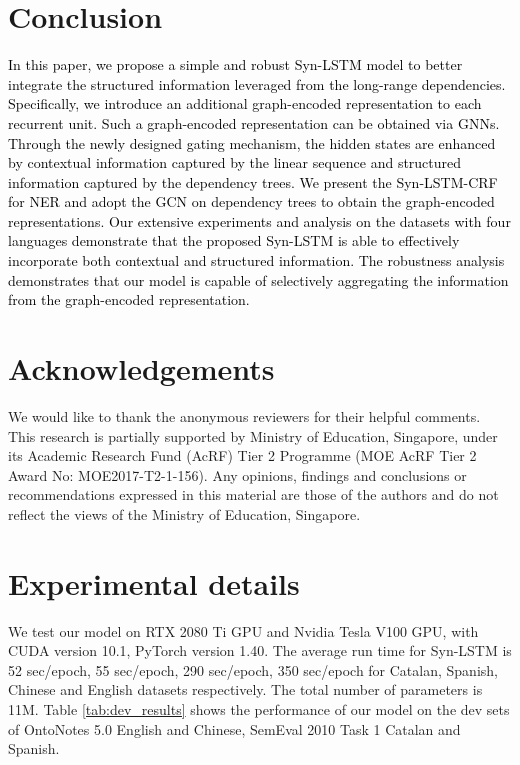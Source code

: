 \documentclass[11pt]{article}
\begin{document}
\section{Conclusion}
\textcolor{black}{
In this paper, we propose a simple and robust Syn-LSTM model to better integrate the structured information leveraged from the long-range dependencies.
Specifically, we introduce an additional graph-encoded representation to each recurrent unit. 
Such a graph-encoded representation can be obtained via GNNs. 
Through the newly designed gating mechanism, the hidden states are enhanced by contextual information captured by the linear sequence and structured information captured by the dependency trees. 
We present the Syn-LSTM-CRF for NER and adopt the GCN on dependency trees to obtain the graph-encoded representations.
Our extensive experiments and analysis on the datasets with four languages demonstrate that the proposed Syn-LSTM is able to effectively incorporate both contextual and structured information. The robustness analysis demonstrates that our model is capable of selectively aggregating the information from the graph-encoded representation.
}



\section*{Acknowledgements}

We would like to thank the anonymous reviewers for their helpful comments.
This research is partially supported by Ministry of Education, Singapore, under its Academic Research Fund (AcRF) Tier 2 Programme (MOE AcRF Tier 2 Award No: MOE2017-T2-1-156). 
Any opinions, findings and conclusions or recommendations expressed in this material are those of the authors and do not reflect the views of the Ministry of Education, Singapore.












\appendix

\section{Experimental details}
We test our model on RTX 2080 Ti GPU and Nvidia Tesla V100 GPU, with CUDA version 10.1, PyTorch version 1.40. 
The average run time for Syn-LSTM is 52 sec/epoch,  55 sec/epoch,  290 sec/epoch,  350 sec/epoch for Catalan, Spanish, Chinese and English datasets respectively.
The total number of parameters is 11M.
Table \ref{tab:dev_results} shows the performance of our model on the dev sets of  OntoNotes 5.0 English and Chinese, SemEval 2010 Task 1 Catalan and Spanish.
\end{document}

